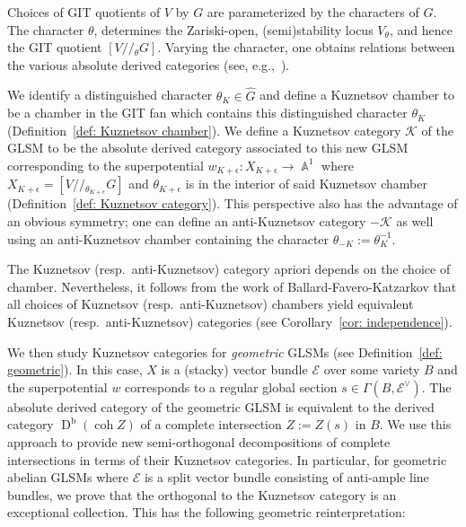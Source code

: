 \documentclass[reqno, 12pt]{amsart}
\theoremstyle{definition}
\newcommand{\op}[1]{\operatorname{#1}}
\newcommand{\modmod}[1]{/ \! \! / \!_{#1}}
\newcommand{\newterm}{\textsf}
\newcommand{\dbcoh}[1]{\operatorname{D}^{\operatorname{b}}(\operatorname{coh }#1)}
\def\R{\op{\mathbb{R}}}
\def\A{\op{\mathbb{A}}}
\numberwithin{equation}{section}
\begin{document}
Choices of GIT quotients of $V$ by $G$ are parameterized by the characters of $G$. The character $\theta$, determines the Zariski-open, (semi)stability locus $V_{\theta}$, and hence the GIT quotient $[V\modmod{\theta}G]$. Varying the character, one obtains relations between the various absolute derived categories (see, e.g.,\ \cite{HHP,  Segal, HW, DHL, VGIT,  HLS, SvdB}). 

We identify a distinguished character $\theta_K \in \widehat G$ and define a \newterm{Kuznetsov chamber} to be a chamber in the GIT fan which contains this distinguished character $\theta_K$ (Definition~\ref{def: Kuznetsov chamber}). We define a \newterm{Kuznetsov category} $\mathcal K$ of the GLSM to be the absolute derived category associated to this new GLSM corresponding to the superpotential $w_{K+\epsilon}: X_{K+\epsilon} \to \A^1$ where $X_{K+\epsilon} = [V\modmod{\theta_{K+\epsilon}} G]$ and $\theta_{K + \epsilon}$ is in the interior of said Kuznetsov chamber (Definition~\ref{def: Kuznetsov category}).  This perspective also has the advantage of an obvious symmetry; one can define an \newterm{anti-Kuznetsov category} $-\mathcal K$ as well using an anti-Kuznetsov chamber containing the character $\theta_{-K} := \theta_K^{-1}$.

The Kuznetsov (resp.\ anti-Kuznetsov) category apriori depends on the choice of chamber.   Nevertheless, it follows from the work of Ballard-Favero-Katzarkov \cite{BFKv2} that all choices of Kuznetsov (resp.\ anti-Kuznetsov) chambers  yield equivalent Kuznetsov (resp.\ anti-Kuznetsov) categories (see  Corollary~\ref{cor: independence}).

We then study Kuznetsov categories for \emph{geometric} GLSMs (see Definition~\ref{def: geometric}). In this case, $X$ is a (stacky) vector bundle $\mathcal {E}$ over some variety $B$ and the superpotential $w$ corresponds to a regular global section $s \in \Gamma(B, \mathcal{E}^\vee)$. The absolute derived category of the geometric GLSM is  equivalent to the derived category $\dbcoh{Z}$ of a complete intersection $Z:=Z(s)$ in $B$. We use this approach to provide new semi-orthogonal decompositions of complete intersections in terms of their Kuznetsov categories. In particular, for geometric abelian GLSMs where $\mathcal{E}$ is a split vector bundle consisting of anti-ample line bundles, we prove that the orthogonal to the Kuznetsov category is an exceptional collection. This has the following geometric reinterpretation:
\end{document}
